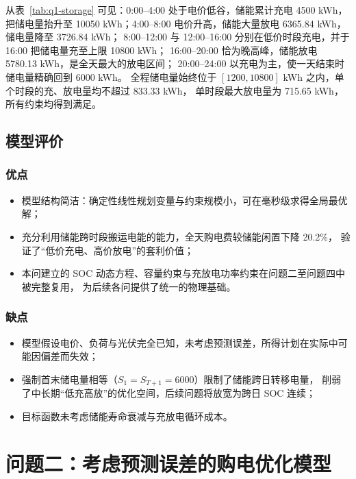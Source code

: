 \documentclass[12pt,a4paper]{article}
\begin{document}
从表~\ref{tab:q1-storage} 可见：0:00--4:00 处于电价低谷，储能累计充电 4500 kWh，
把储电量抬升至 10050 kWh；4:00--8:00 电价升高，储能大量放电 6365.84 kWh，储电量降至 3726.84 kWh；
8:00--12:00 与 12:00--16:00 分别在低价时段充电，并于 16:00 把储电量充至上限 10800 kWh；
16:00--20:00 恰为晚高峰，储能放电 5780.13 kWh，是全天最大的放电区间；
20:00--24:00 以充电为主，使一天结束时储电量精确回到 6000 kWh。
全程储电量始终位于 $[1200, 10800]$ kWh 之内，单个时段的充、放电量均不超过 833.33 kWh，
单时段最大放电量为 715.65 kWh，所有约束均得到满足。

\subsection{模型评价}

\subsubsection{优点}
\begin{itemize}
    \item 模型结构简洁：确定性线性规划变量与约束规模小，可在毫秒级求得全局最优解；
    \item 充分利用储能跨时段搬运电能的能力，全天购电费较储能闲置下降 20.2\%，
          验证了“低价充电、高价放电”的套利价值；
    \item 本问建立的 SOC 动态方程、容量约束与充放电功率约束在问题二至问题四中被完整复用，
          为后续各问提供了统一的物理基础。
\end{itemize}

\subsubsection{缺点}
\begin{itemize}
    \item 模型假设电价、负荷与光伏完全已知，未考虑预测误差，所得计划在实际中可能因偏差而失效；
    \item 强制首末储电量相等（$S_1 = S_{T+1} = 6000$）限制了储能跨日转移电量，
          削弱了中长期“低充高放”的优化空间，后续问题将放宽为跨日 SOC 连续；
    \item 目标函数未考虑储能寿命衰减与充放电循环成本。
\end{itemize}

\section{问题二：考虑预测误差的购电优化模型}
\end{document}
